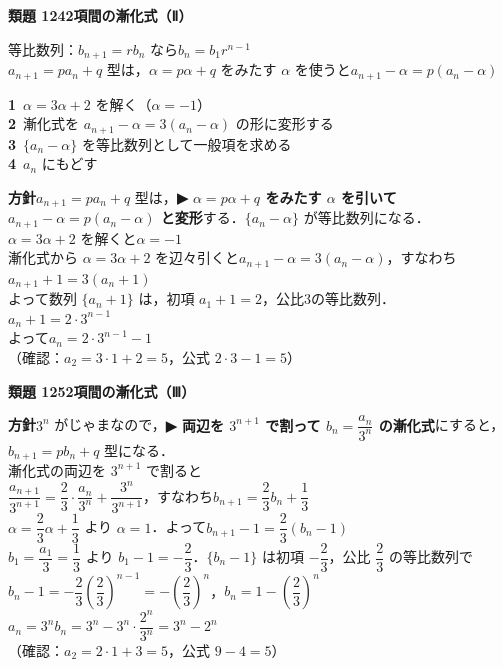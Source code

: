 \documentclass[a4paper,11pt]{ltjsarticle}
\newcommand{\ans}[2]{\Needspace{5\baselineskip}\vspace{6pt}%
  {\sffamily\bfseries 類題 #1\quad #2}\par}
\newcommand{\point}[1]{\textsf{\bfseries ▶ #1}}
\begin{document}
\ans{124}{2項間の漸化式（Ⅱ）}
\begin{kai}
\begin{kakunin}
等比数列：$b_{n+1}=rb_n$ なら\quad $b_n=b_1r^{n-1}$\\
$a_{n+1}=pa_n+q$ 型は，$\alpha=p\alpha+q$ をみたす $\alpha$ を使うと\quad $a_{n+1}-\alpha=p(a_n-\alpha)$
\end{kakunin}
\begin{steps}
\textbf{1}\ $\alpha=3\alpha+2$ を解く（$\alpha=-1$）\\
\textbf{2}\ 漸化式を $a_{n+1}-\alpha=3(a_n-\alpha)$ の形に変形する\\
\textbf{3}\ $\{a_n-\alpha\}$ を等比数列として一般項を求める\\
\textbf{4}\ $a_n$ にもどす
\end{steps}
\textbf{方針}\quad $a_{n+1}=pa_n+q$ 型は，\point{$\alpha=p\alpha+q$ をみたす $\alpha$ を引いて $a_{n+1}-\alpha=p(a_n-\alpha)$ と変形}する．$\{a_n-\alpha\}$ が等比数列になる．\\[2pt]
$\alpha=3\alpha+2$ を解くと\quad $\alpha=-1$\\
漸化式から $\alpha=3\alpha+2$ を辺々引くと\quad $a_{n+1}-\alpha=3(a_n-\alpha)$，すなわち\\
\hspace*{1.5em}$a_{n+1}+1=3(a_n+1)$\\
よって数列 $\{a_n+1\}$ は，初項 $a_1+1=2$，公比3の等比数列．\\
\hspace*{1.5em}$a_n+1=2\cdot3^{n-1}$\\[2pt]
よって\quad $a_n=2\cdot3^{n-1}-1$\\
（確認：$a_2=3\cdot1+2=5$，公式 $2\cdot3-1=5$）
\end{kai}

\ans{125}{2項間の漸化式（Ⅲ）}
\begin{kai}
\textbf{方針}\quad $3^n$ がじゃまなので，\point{両辺を $3^{n+1}$ で割って $b_n=\dfrac{a_n}{3^n}$ の漸化式}にすると，$b_{n+1}=pb_n+q$ 型になる．\\[2pt]
漸化式の両辺を $3^{n+1}$ で割ると\\
\hspace*{1.5em}$\dfrac{a_{n+1}}{3^{n+1}}=\dfrac23\cdot\dfrac{a_n}{3^n}+\dfrac{3^n}{3^{n+1}}$，\quad すなわち\quad $b_{n+1}=\dfrac23b_n+\dfrac13$\\[2pt]
$\alpha=\dfrac23\alpha+\dfrac13$ より $\alpha=1$．よって\quad $b_{n+1}-1=\dfrac23(b_n-1)$\\
$b_1=\dfrac{a_1}3=\dfrac13$ より $b_1-1=-\dfrac23$．$\{b_n-1\}$ は初項 $-\dfrac23$，公比 $\dfrac23$ の等比数列で\\
\hspace*{1.5em}$b_n-1=-\dfrac23\left(\dfrac23\right)^{n-1}=-\left(\dfrac23\right)^n$，\quad $b_n=1-\left(\dfrac23\right)^n$\\[2pt]
$a_n=3^nb_n=3^n-3^n\cdot\dfrac{2^n}{3^n}=3^n-2^n$\\
（確認：$a_2=2\cdot1+3=5$，公式 $9-4=5$）
\end{kai}
\end{document}
